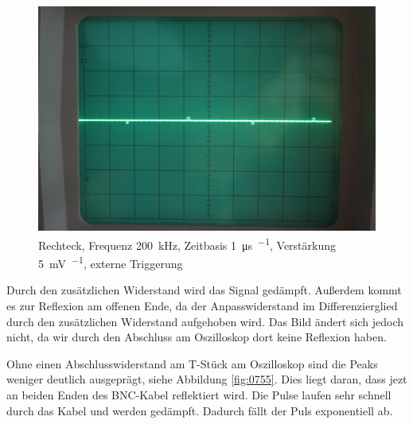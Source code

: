 \begin{figure}[htbp]
	\centering
	\begin{minipage}{.45\linewidth}
	\end{minipage}
	\hfill
	\begin{minipage}{.45\linewidth}
	\includegraphics[width=\linewidth]{Fotos/IMG_0753-1500.jpg}
	\end{minipage}
	\caption{%
		Rechteck, Frequenz \SI{200}{\kilo\hertz}, Zeitbasis \SI{1}{\micro\second\per\division}, Verstärkung \SI{5}{\milli\volt\per\division}, externe Triggerung
	}
	\label{fig:0753}
\end{figure}

Durch den zusätzlichen Widerstand wird das Signal gedämpft. Außerdem kommt es
zur Reflexion am offenen Ende, da der Anpasswiderstand im Differenzierglied
durch den zusätzlichen Widerstand aufgehoben wird. Das Bild ändert sich jedoch
nicht, da wir durch den Abschluss am Oszilloskop dort keine Reflexion haben.

Ohne einen Abschlusswiderstand am T-Stück am Oszilloskop sind die Peaks weniger
deutlich ausgeprägt, siehe Abbildung \ref{fig:0755}. Dies liegt daran, dass
jezt an beiden Enden des BNC-Kabel reflektiert wird. Die Pulse laufen sehr
schnell durch das Kabel und werden gedämpft. Dadurch fällt der Puls
exponentiell ab.

